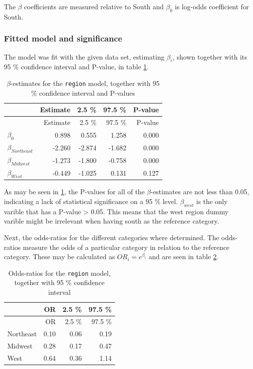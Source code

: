 \documentclass[a4paper]{article}
\begin{document}
The \(\beta\) coefficients are measured relative to South and
\(\beta_0\) is log-odds coefficient for South.

\hypertarget{fitted-model-and-significance-1}{%
\subsubsection{Fitted model and
significance}\label{fitted-model-and-significance-1}}

The model was fit with the given data set, estimating \(\beta_i\), shown
together with its 95 \% confidence interval and P-value, in table
\ref{tab:region_beta}.

\begin{longtable}[]{@{}lrrrr@{}}
\caption{\label{tab:region_beta}\(\beta\)-estimates for the
\texttt{region} model, together with 95 \% confidence interval and
P-values}\tabularnewline
\toprule
& Estimate & 2.5 \% & 97.5 \% & P-value\tabularnewline
\midrule
\endfirsthead
\toprule
& Estimate & 2.5 \% & 97.5 \% & P-value\tabularnewline
\midrule
\endhead
\(\beta_0\) & 0.898 & 0.555 & 1.258 & 0.000\tabularnewline
\(\beta_{Northeast}\) & -2.260 & -2.874 & -1.682 & 0.000\tabularnewline
\(\beta_{Midwest}\) & -1.273 & -1.800 & -0.758 & 0.000\tabularnewline
\(\beta_{West}\) & -0.449 & -1.025 & 0.131 & 0.127\tabularnewline
\bottomrule
\end{longtable}

As may be seen in \ref{tab:region_beta}, the P-values for all of the
\(\beta\)-estimates are not less than 0.05, indicating a lack of
statistical significance on a 95 \% level. \(\beta_{west}\) is the only
varible that has a P-value \textgreater{} 0.05. This means that the west
region dummy varible might be irrelevant when having south as the
reference category.

Next, the odds-ratios for the different categories where determined. The
odds-ratios measure the odds of a particular category in relation to the
reference category. These may be calculated as \(OR_i = e^{\beta_i}\)
and are seen in table \ref{tab:region_OR}.

\begin{longtable}[]{@{}lrrr@{}}
\caption{\label{tab:region_OR}Odds-ratios for the \texttt{region} model,
together with 95 \% confidence interval}\tabularnewline
\toprule
& OR & 2.5 \% & 97.5 \%\tabularnewline
\midrule
\endfirsthead
\toprule
& OR & 2.5 \% & 97.5 \%\tabularnewline
\midrule
\endhead
Northeast & 0.10 & 0.06 & 0.19\tabularnewline
Midwest & 0.28 & 0.17 & 0.47\tabularnewline
West & 0.64 & 0.36 & 1.14\tabularnewline
\bottomrule
\end{longtable}
\end{document}
